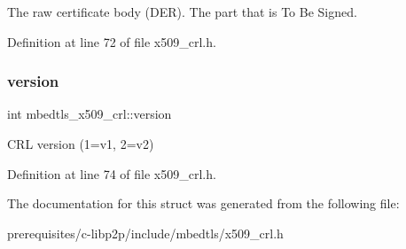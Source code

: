 The raw certificate body (D\+ER). The part that is To Be Signed. 

Definition at line 72 of file x509\+\_\+crl.\+h.

\mbox{\label{structmbedtls__x509__crl_aaf0d47225a63a5d9bf0e2e99d641e72d}} 
\subsubsection{\texorpdfstring{version}{version}}
{\footnotesize\ttfamily int mbedtls\+\_\+x509\+\_\+crl\+::version}

C\+RL version (1=v1, 2=v2) 

Definition at line 74 of file x509\+\_\+crl.\+h.



The documentation for this struct was generated from the following file\+:\begin{DoxyCompactItemize}
\item 
prerequisites/c-\/libp2p/include/mbedtls/x509\+\_\+crl.\+h\end{DoxyCompactItemize}
